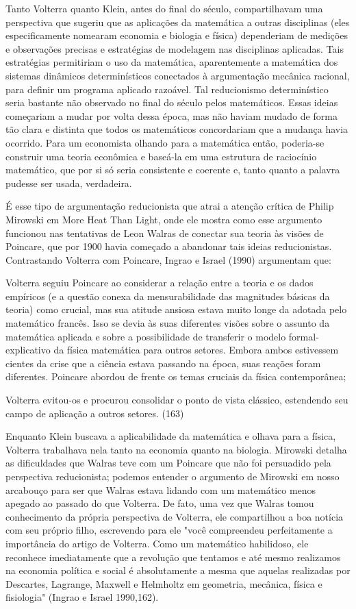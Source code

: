 \documentclass[a4paper,12pt]{article}[abntex2]
\begin{document}
Tanto Volterra quanto Klein, antes do final do século, compartilhavam uma perspectiva que sugeriu que as aplicações da matemática a outras disciplinas (eles especificamente nomearam economia e biologia e física) dependeriam de medições e observações precisas e estratégias de modelagem nas disciplinas aplicadas. Tais estratégias permitiriam o uso da matemática, aparentemente a matemática dos sistemas dinâmicos determinísticos conectados à argumentação mecânica racional, para definir um programa aplicado razoável. Tal reducionismo determinístico seria bastante não observado no final do século pelos matemáticos. Essas ideias começariam a mudar por volta dessa época, mas não haviam mudado de forma tão clara e distinta que todos os matemáticos concordariam que a mudança havia ocorrido. Para um economista olhando para a matemática então, poderia-se construir uma teoria econômica e baseá-la em uma estrutura de raciocínio matemático, que por si só seria consistente e coerente e, tanto quanto a palavra pudesse ser usada, verdadeira.

É esse tipo de argumentação reducionista que atrai a atenção crítica de Philip Mirowski em More Heat Than Light, onde ele mostra como esse argumento funcionou nas tentativas de Leon Walras de conectar sua teoria às visões de Poincare, que por 1900 havia começado a abandonar tais ideias reducionistas. Contrastando Volterra com Poincare, Ingrao e Israel (1990) argumentam que:

Volterra seguiu Poincare ao considerar a relação entre a teoria e os dados empíricos (e a questão conexa da mensurabilidade das magnitudes básicas da teoria) como crucial, mas sua atitude ansiosa estava muito longe da adotada pelo matemático francês. Isso se devia às suas diferentes visões sobre o assunto da matemática aplicada e sobre a possibilidade de transferir o modelo formal-explicativo da física matemática para outros setores. Embora ambos estivessem cientes da crise que a ciência estava passando na época, suas reações foram diferentes. Poincare abordou de frente os temas cruciais da física contemporânea;

Volterra evitou-os e procurou consolidar o ponto de vista clássico, estendendo seu campo de aplicação a outros setores. (163)

Enquanto Klein buscava a aplicabilidade da matemática e olhava para a física, Volterra trabalhava nela tanto na economia quanto na biologia. Mirowski detalha as dificuldades que Walras teve com um Poincare que não foi persuadido pela perspectiva reducionista; podemos entender o argumento de Mirowski em nosso arcabouço para ser que Walras estava lidando com um matemático menos apegado ao passado do que Volterra. De fato, uma vez que Walras tomou conhecimento da própria perspectiva de Volterra, ele compartilhou a boa notícia com seu próprio filho, escrevendo para ele "você compreendeu perfeitamente a importância do artigo de Volterra. Como um matemático habilidoso, ele reconhece imediatamente que a revolução que tentamos e até mesmo realizamos na economia política e social é absolutamente a mesma que aquelas realizadas por Descartes, Lagrange, Maxwell e Helmholtz em geometria, mecânica, física e fisiologia" (Ingrao e Israel 1990,162).
\end{document}
